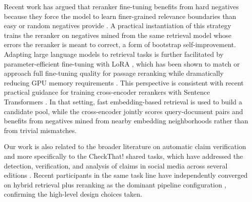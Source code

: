 Recent work has argued that reranker fine-tuning benefits from hard negatives because they force the model to learn finer-grained relevance 
boundaries than easy or random negatives provide \citep{MeghwaniEtAl2025HardNegatives}. A practical instantiation of this strategy trains the reranker on negatives mined from the same retrieval model whose errors the reranker is meant to correct, a form of bootstrap 
self-improvement. Adapting large language models to retrieval tasks is further facilitated by parameter-efficient fine-tuning with LoRA \citep{HuEtAl2022}, which has been shown to match or approach full fine-tuning quality for passage reranking while dramatically reducing GPU memory requirements \citep{nijasure2025relevance}. This perspective is consistent with recent practical guidance for training cross-encoder rerankers with Sentence Transformers \citep{Aarsen2025TrainReranker}. In that setting, fast embedding-based retrieval is used to build a candidate pool, while the cross-encoder jointly scores query-document pairs and benefits from negatives mined from nearby embedding neighborhoods rather than from trivial mismatches. 

Our work is also related to the broader literature on automatic claim verification and more specifically to the CheckThat! shared tasks, which have addressed the detection, verification, and analysis of claims in social media across several editions \citep{ElsayedEtAl2019,BarronCedenoEtAl2020,NakovEtAl2021}. Recent participants in the same task line have  independently converged on hybrid retrieval plus reranking as the dominant pipeline configuration \citep{Sager2025, Schofield2025}, confirming the high-level design choices taken.